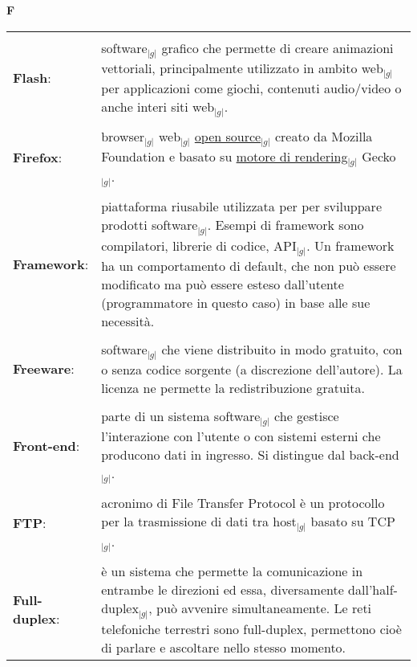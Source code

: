 \hfill\Huge{\textbf{F}}\\
\normalsize
\label{tabVers}
	\begin{longtable}{p{} p{}} 
	    \toprule
	    \\
	    \textbf{Flash}:		&	software$_{|g|}$ grafico che permette di creare animazioni vettoriali, principalmente utilizzato in ambito web$_{|g|}$ per applicazioni come giochi, contenuti audio/video 
						o anche interi siti web$_{|g|}$.\\
	    \\
	    \textbf{Firefox}:		&	browser$_{|g|}$ web$_{|g|}$ \underline{open source}$_{|g|}$ creato da Mozilla Foundation e basato su \underline{motore di rendering}$_{|g|}$ Gecko$_{|g|}$.\\
	    \\
	    
	    \textbf{Framework}:		&	piattaforma riusabile utilizzata per per sviluppare prodotti software$_{|g|}$. Esempi di framework sono compilatori, librerie di codice, API$_{|g|}$.
						Un framework ha un comportamento di default, che non può essere modificato ma può essere esteso dall’utente (programmatore in questo caso) in base alle sue necessità.\\
	    \\
	    \textbf{Freeware}:		&	software$_{|g|}$ che viene distribuito in modo gratuito, con o senza codice sorgente (a discrezione dell'autore). 
						La licenza ne permette la redistribuzione gratuita.\\
	    \\
	    \textbf{Front-end}:		&	parte di un sistema software$_{|g|}$ che gestisce l’interazione con l’utente o con sistemi esterni che producono dati in ingresso. Si distingue dal back-end$_{|g|}$.\\
	    \\
	    \textbf{FTP}:		& 	acronimo di File Transfer Protocol è un protocollo per la trasmissione di dati tra host$_{|g|}$ basato su TCP$_{|g|}$.\\
	    \\
	    \textbf{Full-duplex}:	&	è un sistema che permette la comunicazione in entrambe le direzioni ed essa, diversamente dall'half-duplex$_{|g|}$, può avvenire simultaneamente. Le reti telefoniche terrestri sono 
						full-duplex, permettono cioè di parlare e ascoltare nello stesso momento.\\
	\end{longtable}
\newpage


